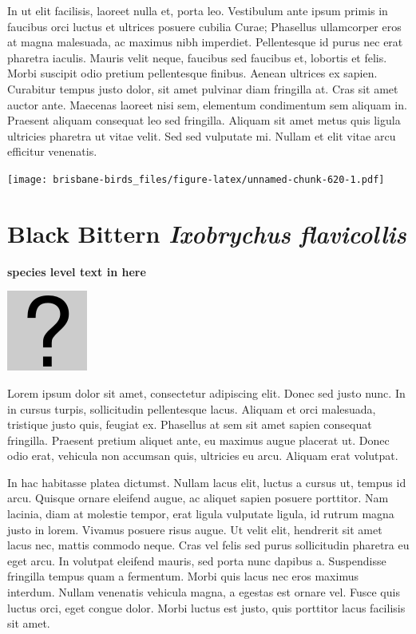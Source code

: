 \documentclass[]{book}
\let\origfigure\figure
\let\endorigfigure\endfigure
\renewenvironment{figure}[1][2] {
  \expandafter\origfigure\expandafter[H]
} {
  \endorigfigure
}
\begin{document}
In ut elit facilisis, laoreet nulla et, porta leo. Vestibulum ante ipsum
primis in faucibus orci luctus et ultrices posuere cubilia Curae;
Phasellus ullamcorper eros at magna malesuada, ac maximus nibh
imperdiet. Pellentesque id purus nec erat pharetra iaculis. Mauris velit
neque, faucibus sed faucibus et, lobortis et felis. Morbi suscipit odio
pretium pellentesque finibus. Aenean ultrices ex sapien. Curabitur
tempus justo dolor, sit amet pulvinar diam fringilla at. Cras sit amet
auctor ante. Maecenas laoreet nisi sem, elementum condimentum sem
aliquam in. Praesent aliquam consequat leo sed fringilla. Aliquam sit
amet metus quis ligula ultricies pharetra ut vitae velit. Sed sed
vulputate mi. Nullam et elit vitae arcu efficitur venenatis.

\begin{figure}
\centering
\texttt{[image: brisbane-birds\_files/figure-latex/unnamed-chunk-620-1.pdf]}
\caption{\label{fig:unnamed-chunk-620}insert figure caption}
\end{figure}

\section{\texorpdfstring{Black Bittern \emph{Ixobrychus
flavicollis}}{Black Bittern Ixobrychus flavicollis}}\label{black-bittern-ixobrychus-flavicollis}

\textbf{species level text in here}

\begin{figure}
\centering
\includegraphics{assets/missing.png}
\caption{No image for species}
\end{figure}

Lorem ipsum dolor sit amet, consectetur adipiscing elit. Donec sed justo
nunc. In in cursus turpis, sollicitudin pellentesque lacus. Aliquam et
orci malesuada, tristique justo quis, feugiat ex. Phasellus at sem sit
amet sapien consequat fringilla. Praesent pretium aliquet ante, eu
maximus augue placerat ut. Donec odio erat, vehicula non accumsan quis,
ultricies eu arcu. Aliquam erat volutpat.

In hac habitasse platea dictumst. Nullam lacus elit, luctus a cursus ut,
tempus id arcu. Quisque ornare eleifend augue, ac aliquet sapien posuere
porttitor. Nam lacinia, diam at molestie tempor, erat ligula vulputate
ligula, id rutrum magna justo in lorem. Vivamus posuere risus augue. Ut
velit elit, hendrerit sit amet lacus nec, mattis commodo neque. Cras vel
felis sed purus sollicitudin pharetra eu eget arcu. In volutpat eleifend
mauris, sed porta nunc dapibus a. Suspendisse fringilla tempus quam a
fermentum. Morbi quis lacus nec eros maximus interdum. Nullam venenatis
vehicula magna, a egestas est ornare vel. Fusce quis luctus orci, eget
congue dolor. Morbi luctus est justo, quis porttitor lacus facilisis sit
amet.
\end{document}
